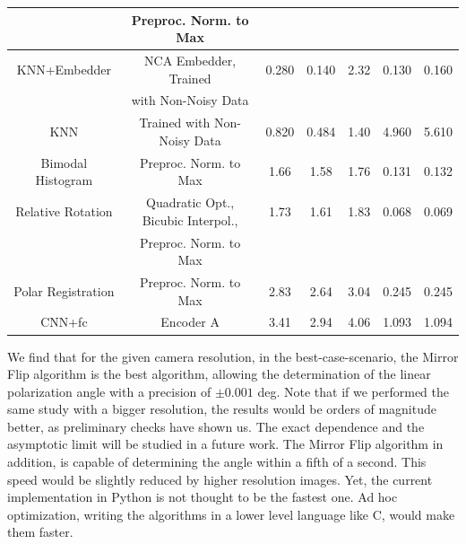 \documentclass[11pt, a4paper, twoside]{article} %
\begin{document}
\begin{table}[h!]
\begin{tabular}{c|c|c|cc|cc}
           &  Preproc. Norm. to Max & & & & \\ \hline
           \rule{0pt}{4mm}{}
          KNN+Embedder &              NCA Embedder, Trained  & 0.280 &    0.140 &   2.32 &        0.130 &       0.160 \\
                       &                 with Non-Noisy Data &         &            &           &              &             \\ \hline\rule{0pt}{4mm}{}
                   KNN &         Trained with Non-Noisy Data & 0.820&    0.484 &   1.40 &        4.960 &       5.610 \\ \hline\rule{0pt}{4mm}{}
     Bimodal Histogram &               Preproc. Norm. to Max & 1.66 &    1.58 &   1.76 &        0.131 &       0.132 \\ \hline\rule{0pt}{4mm}{}
     Relative Rotation & Quadratic Opt., Bicubic Interpol.,  & 1.73 &    1.61 &   1.83 &        0.068 &       0.069 \\
                       &               Preproc. Norm. to Max &         &            &           &              &             \\ \hline\rule{0pt}{4mm}{}
    Polar Registration &               Preproc. Norm. to Max & 2.83 &    2.64 &   3.04 &        0.245 &       0.245 \\ \hline\rule{0pt}{4mm}{}
                CNN+fc &                           Encoder A & 3.41 &    2.94 &   4.06 &        1.093 &       1.094 \\
\bottomrule
\end{tabular}

\end{table}



We find that for the given camera resolution, in the best-case-scenario, the Mirror Flip algorithm is the best algorithm, allowing the determination of the linear polarization angle with a precision of $\pm 0.001$ deg. Note that if we performed the same study with a bigger resolution, the results would be orders of magnitude better, as preliminary checks have shown us. The exact dependence and the asymptotic limit will be studied in a future work. The Mirror Flip algorithm in addition, is capable of determining the angle within a fifth of a second. This speed would be slightly reduced by higher resolution images. Yet, the current implementation in Python is not thought to be the fastest one. Ad hoc optimization, writing the algorithms in a lower level language like C, would make them faster.
\end{document}
